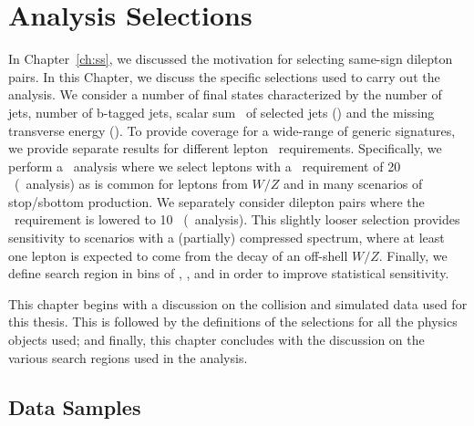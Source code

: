 \chapter{Analysis Selections}
\label{ch:evtsel}
In Chapter~\ref{ch:ss}, we discussed the motivation for selecting same-sign
dilepton pairs. In this Chapter, we discuss the specific selections used to
carry out the analysis. We consider a number of final states characterized
by the number of jets, number of b-tagged jets, scalar sum \pt~of selected
jets (\Ht) and the missing transverse energy (\met). To provide coverage for
a wide-range of generic signatures, we provide separate results for different
lepton \pt~requirements. Specifically, we perform a \hpt~analysis where we
select leptons with a \pt~requirement of 20 \GeV~(\hpt~analysis) as is common
for leptons from $W/Z$ and in many scenarios of stop/sbottom production. We
separately consider dilepton pairs where the \pt~requirement is lowered to 10
\GeV~(\lpt~analysis). This slightly looser selection provides sensitivity to
scenarios with a (partially) compressed spectrum, where at least one lepton
is expected to come from the decay of an off-shell $W/Z$. Finally, we define
search region in bins of \njets, \nbtags, \Ht and \met in order to improve
statistical sensitivity.

This chapter begins with a discussion on the collision and simulated data used
for this thesis. This is followed by the definitions of the selections for
all the physics objects used; and finally, this chapter concludes with the
discussion on the various search regions used in the analysis.

\section{Data Samples}
\label{sec:evtsel_samples}


